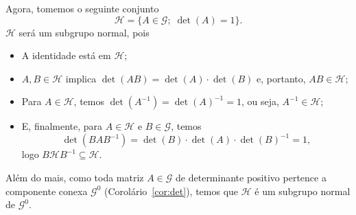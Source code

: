 \documentclass[twoside,openright,titlepage,numbers=noenddot,headinclude,  lineheaders footinclude=true,cleardoublepage=empty,
                                BCOR=5mm,paper=a4,fontsize=12pt ]{scrbook}
\DeclareMathOperator\tr{tr}
\newtheorem{prop}[teo]{Proposição}
\theoremstyle{definition}
\begin{document}
Agora, tomemos o seguinte conjunto
\[ \mathcal{H} = \{A \in \mathcal{G}; \; \det(A) = 1 \}. \]
$\mathcal{H}$ será um subgrupo normal, pois 
\begin{itemize}
	\item A identidade está em $\mathcal{H}$;
	\item $A, B \in \mathcal{H}$ implica $\det(AB) = \det(A) \cdot \det(B)$ e, portanto, $AB \in \mathcal{H}$;
	\item Para $A \in \mathcal{H}$, temos $\det(A^{-1}) = \det(A)^{-1} = 1$, ou seja, $A^{-1} \in \mathcal{H}$;
	\item E, finalmente, para $A \in \mathcal{H}$ e $B \in \mathcal{G}$, temos 
		\[ \det(BAB^{-1}) = \det(B) \cdot \det(A) \cdot \det(B)^{-1} = 1,\] 
		logo $B \mathcal{H} B^{-1} \subseteq \mathcal{H}$.
\end{itemize}
Além do mais, como toda matriz $A \in \mathcal{G}$ de determinante positivo pertence a componente
conexa $\mathcal{G}^0$ (Corolário~\ref{cor:det}), temos que
$\mathcal{H}$ é um subgrupo normal de $\mathcal{G}^0$.
%
\end{document}

